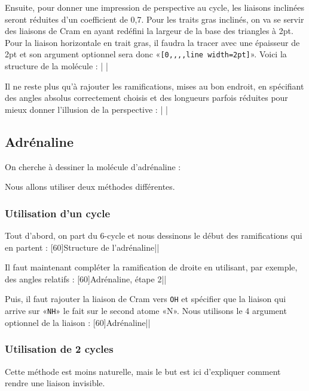 \documentclass[10pt,french]{article}
\makeatletter
\newcommand\make@car@active[1]{%
	\catcode`#1\active
	\begingroup
		\lccode`\~`#1\relax
		\lowercase{\endgroup\def~}%
}
\newif\if@exstar
\newcommand\exemple{%
	\begingroup
	\parskip\z@
	\@makeother\;\@makeother\!\@makeother\?\@makeother\:%
	\@ifstar{\@exstartrue\exemple@}{\@exstarfalse\exemple@}}
\newcommand\exemple@[2][65]{%
	\medbreak\noindent
	\begingroup
		\let\do\@makeother\dospecials
		\make@car@active\ { {}}%
		\make@car@active\^^M{\par\leavevmode}%
		\make@car@active\^^I{\space\space}%
		\make@car@active\,{\leavevmode\kern\z@\string,}%
		\make@car@active\-{\leavevmode\kern\z@\string-}%
		\make@car@active\>{\leavevmode\kern\z@\string>}%
		\make@car@active\<{\leavevmode\kern\z@\string<}%
		\exemple@@{#1}{#2}%
}
\newcommand\exemple@@[3]{%
	\def\@tempa##1#3{\exemple@@@{#1}{#2}{##1}}%
	\@tempa
}
\newcommand\exemple@@@[3]{%
	\xdef\the@code{#3}%
	\endgroup
	\if@exstar
		\begingroup
			\fboxrule0.4pt
			\let\breakboxparindent\z@
			\def\bkvz@bottom{\hrule\@height\fboxrule}%
			\let\bkvz@before@breakbox\relax
			\def\bkvz@set@linewidth{\advance\linewidth\dimexpr-2\fboxrule-2\fboxsep}%
			\def\bkvz@left{\vrule\@width\fboxrule\hskip\fboxsep}%
			\def\bkvz@right{\hskip\fboxsep\vrule\@width\fboxrule}%
			\def\bkvz@top{\hbox to \hsize{%
				\vrule\@width\fboxrule\@height\fboxrule
				\leaders\bkvz@bottom\hfill
				\sffamily
				\fboxsep\z@
				\colorbox{black}{\kern0.25em\color{white}\footnotesize\lower0.5ex\hbox{\strut#2}\kern0.25em}%
				\leaders\bkvz@bottom\hfill
				\vrule\@width\fboxrule\@height\fboxrule}}%
			\breakbox
				\kern.5ex\relax
				\ttfamily\footnotesize\the@code\par
				\normalfont
				\kern3pt
				\hrule height0.1pt width\linewidth depth0.1pt
				\vskip5pt
				\rightskip0pt plus 1fill
				\everypar{{\color{lightgray}\rlap{\vrule height0.1pt width\linewidth depth0.1pt}}\hskip0pt plus 1fill}%
				\newlinechar`\^^M\everyeof{\noexpand}\scantokens{#3}\par
			\endbreakbox
		\endgroup
	\else
		\vskip0.5ex
		\boxput*(0,1)
			{\fboxsep\z@
			\hbox{\sffamily\colorbox{black}{\leavevmode\kern0.25em{\color{white}\footnotesize\strut#2}\kern0.25em}}%
			}%
			{\fboxsep5pt
			\fbox{%
				$\vcenter{\hsize\dimexpr0.#1\linewidth-\fboxsep-\fboxrule\relax
					\kern5pt\parskip0pt \ttfamily\footnotesize\the@code}%
				\vcenter{\kern5pt\hsize\dimexpr\linewidth-0.#1\linewidth-\fboxsep-\fboxrule\relax
					\everypar{{\color{lightgray}\rlap{\vrule height0.1pt width\dimexpr\linewidth-0.#1\linewidth-\fboxsep-\fboxrule depth0.1pt}}}%
					\footnotesize\newlinechar`\^^M\everyeof{\noexpand}\scantokens{#3}}$%
				}%
			}%
	\fi
	\medbreak
	\endgroup
}
\let\do\@makeother\dospecials
\makeatother
\begin{document}
Ensuite, pour donner une impression de perspective au cycle, les liaisons inclinées seront réduites d'un coefficient de 0,7. Pour les traits gras inclinés, on va se servir des liaisons de Cram en ayant redéfini la largeur de la base des triangles à 2pt. Pour la liaison horizontale en trait gras, il faudra la tracer  avec une épaisseur de 2pt et son argument optionnel sera donc «\verb/[0,,,,line width=2pt]/». Voici la structure de la molécule :
\exemple{Structure}|
|

Il ne reste plus qu'à rajouter les ramifications, mises au bon endroit, en spécifiant des angles absolus correctement choisis et des longueurs parfois réduites pour mieux donner l'illusion de la perspective :
\exemple{Projection de Haworth}|
|

\subsection{Adrénaline}
On cherche à dessiner la molécule d'adrénaline :

Nous allons utiliser deux méthodes différentes.

\subsubsection{Utilisation d'un cycle}
Tout d'abord, on part du 6-cycle et nous dessinons le début des ramifications qui en partent :
\exemple[60]{Structure de l'adrénaline}||

Il faut maintenant compléter la ramification de droite en utilisant, par exemple, des angles relatifs :
\exemple[60]{Adrénaline, étape 2}||

Puis, il faut rajouter la liaison de Cram vers \verb-OH- et spécifier que la liaison qui arrive sur «\verb-NH-» le fait sur le second atome «N». Nous utilisons le 4\ieme{} argument optionnel de la liaison :
\exemple[60]{Adrénaline}||

\subsubsection{Utilisation de 2 cycles}
Cette méthode est moins naturelle, mais le but est ici d'expliquer comment rendre une liaison invisible.
\end{document}
